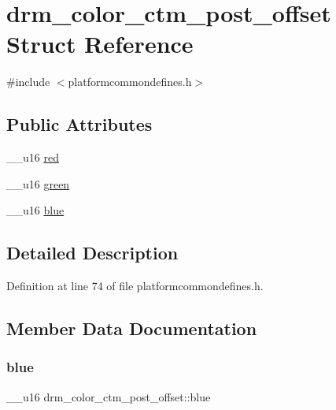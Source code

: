\hypertarget{structdrm__color__ctm__post__offset}{}\section{drm\+\_\+color\+\_\+ctm\+\_\+post\+\_\+offset Struct Reference}
\label{structdrm__color__ctm__post__offset}


{\ttfamily \#include $<$platformcommondefines.\+h$>$}

\subsection*{Public Attributes}
\begin{DoxyCompactItemize}
\item 
\+\_\+\+\_\+u16 \mbox{\hyperlink{structdrm__color__ctm__post__offset_a5b7b2feda04ca2d62ba2c569d2458dc3}{red}}
\item 
\+\_\+\+\_\+u16 \mbox{\hyperlink{structdrm__color__ctm__post__offset_a1deb06f90eac8e9e1f21e6d2728af1b4}{green}}
\item 
\+\_\+\+\_\+u16 \mbox{\hyperlink{structdrm__color__ctm__post__offset_a0e188b6d4e15dca3cb42acfc17a63a6b}{blue}}
\end{DoxyCompactItemize}


\subsection{Detailed Description}


Definition at line 74 of file platformcommondefines.\+h.



\subsection{Member Data Documentation}
\mbox{\label{structdrm__color__ctm__post__offset_a0e188b6d4e15dca3cb42acfc17a63a6b}} 
\subsubsection{\texorpdfstring{blue}{blue}}
{\footnotesize\ttfamily \+\_\+\+\_\+u16 drm\+\_\+color\+\_\+ctm\+\_\+post\+\_\+offset\+::blue}



